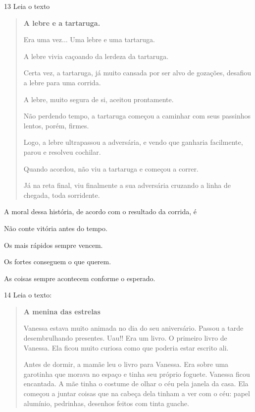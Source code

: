 \num{13} Leia o texto

\begin{quote}
\textbf{A lebre e a tartaruga.}

Era uma vez... Uma lebre e uma tartaruga.

A lebre vivia caçoando da lerdeza da tartaruga.

Certa vez, a tartaruga, já muito cansada por ser alvo de gozações,
desafiou a lebre para uma corrida.

A lebre, muito segura de si, aceitou prontamente.

Não perdendo tempo, a tartaruga começou a caminhar com seus passinhos
lentos, porém, firmes.

Logo, a lebre ultrapassou a adversária, e vendo que ganharia facilmente, parou
e resolveu cochilar.

Quando acordou, não viu a tartaruga e começou a correr.

Já na reta final, viu finalmente a sua adversária cruzando a linha de
chegada, toda sorridente.
\end{quote}


A moral dessa história, de acordo com o resultado da corrida, é

\begin{escolha}
\item Não conte vitória antes do tempo.

\item Os mais rápidos sempre vencem.

\item Os fortes conseguem o que querem.

\item As coisas sempre acontecem conforme o esperado.
\end{escolha}


\num{14} Leia o texto:

\begin{quote}
\textbf{A menina das estrelas}

Vanessa estava muito animada no dia do seu aniversário. Passou a tarde
desembrulhando presentes. Uau!! Era um livro. O primeiro livro de
Vanessa. Ela ficou muito curiosa como que poderia estar escrito ali.

Antes de dormir, a mamãe leu o livro para Vanessa. Era sobre uma
garotinha que morava no espaço e tinha seu próprio foguete. Vanessa
ficou encantada. A mãe tinha o costume de olhar o céu pela janela da
casa. Ela começou a juntar coisas que na cabeça dela tinham a ver com o
céu: papel alumínio, pedrinhas, desenhos feitos com tinta guache.
\end{quote}

